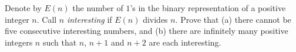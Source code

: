 Denote by $E(n)$ the number of $1$'s in the binary representation of a positive integer $n$. Call $n$ \textit{interesting} if $E(n)$ divides $n$. Prove that
(a) there cannot be five consecutive interesting numbers, and
(b) there are infinitely many positive integers $n$ such that $n$, $n+1$ and $n+2$ are each interesting.